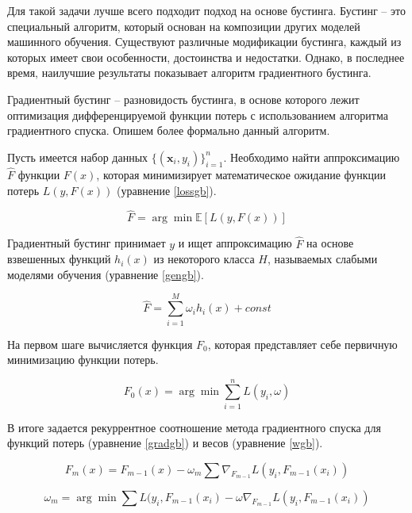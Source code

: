 Для такой задачи лучше всего подходит подход на основе бустинга.
Бустинг -- это специальный алгоритм,
который основан на композиции других моделей машинного обучения.
Существуют различные модификации бустинга,
каждый из которых имеет свои особенности,
достоинства и недостатки.
Однако, в последнее время, наилучшие результаты
показывает алгоритм градиентного бустинга.

Градиентный бустинг -- разновидость бустинга,
в основе которого лежит
оптимизация дифференцируемой функции потерь
с использованием алгоритма градиентного спуска.
Опишем более формально данный алгоритм.

Пусть имеется набор данных $\{(\textbf{x}_i,y_i)\}_{i=1}^n$.
Необходимо найти аппроксимацию $\hat{F}$ функции $F(x)$,
которая минимизирует математическое ожидание
функции потерь $L(y, F(x))$ (уравнение \ref{lossgb}).

\begin{equation} \label{lossgb}
    \hat{F} = \arg \min \mathbb{E}[L(y, F(x))]
\end{equation}

Градиентный бустинг принимает $y$ и 
ищет аппроксимацию $\hat{F}$ на основе
взвешенных функций $h_i(x)$ из некоторого класса $H$,
называемых слабыми моделями обучения (уравнение \ref{gengb}).

\begin{equation} \label{gengb}
    \hat{F} = \sum_{i=1}^M \omega_i h_i(x) + const
\end{equation}

На первом шаге вычисляется функция $F_0$,
которая представляет себе первичную минимизацию функции потерь.

\begin{equation}
    F_0(x) = \arg \min \sum_{i=1}^n L(y_i, \omega)
\end{equation}

В итоге задается рекуррентное соотношение
метода градиентного спуска 
для функций потерь (уравнение \ref{gradgb}) и весов (уравнение \ref{wgb}).

\begin{equation} \label{gradgb}
    F_m(x) = F_{m-1}(x) - \omega_m \sum \nabla_{F_{m-1}} L(y_i, F_{m-1}(x_i))
\end{equation}

\begin{equation} \label{wgb}
    \omega_m = \arg \min \sum L(y_i, F_{m-1}(x_i) - \omega \nabla_{F_{m-1}} L(y_i, F_{m-1}(x_i))
\end{equation}

